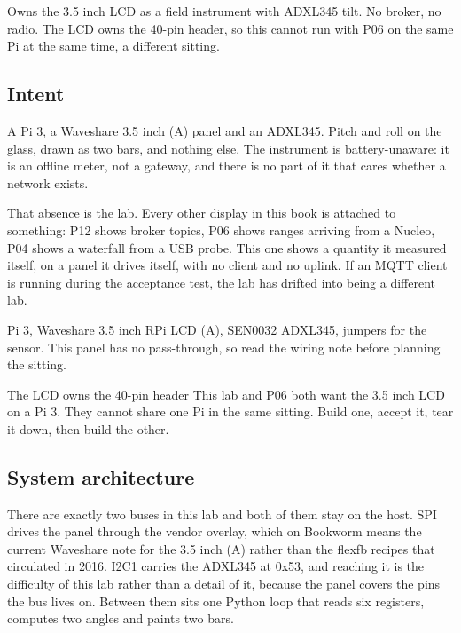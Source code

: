 
\begin{unique}
Owns the 3.5 inch LCD as a field instrument with ADXL345 tilt. No broker, no radio. The LCD owns the 40-pin header, so this cannot run with P06 on the same Pi at the same time, a different sitting.
\end{unique}

\subsection*{Intent}

A Pi 3, a Waveshare 3.5 inch (A) panel and an ADXL345. Pitch and roll on the glass, drawn as two bars, and nothing else. The instrument is battery-unaware: it is an offline meter, not a gateway, and there is no part of it that cares whether a network exists.

That absence is the lab. Every other display in this book is attached to something: P12 shows broker topics, P06 shows ranges arriving from a Nucleo, P04 shows a waterfall from a USB probe. This one shows a quantity it measured itself, on a panel it drives itself, with no client and no uplink. If an MQTT client is running during the acceptance test, the lab has drifted into being a different lab.

\begin{kit}
Pi 3, Waveshare 3.5 inch RPi LCD (A), SEN0032 ADXL345, jumpers for the sensor. This panel has no pass-through, so read the wiring note before planning the sitting.
\end{kit}

\begin{rulebox}{The LCD owns the 40-pin header}
This lab and P06 both want the 3.5 inch LCD on a Pi 3. They cannot share one Pi in the same sitting. Build one, accept it, tear it down, then build the other.
\end{rulebox}

\subsection*{System architecture}


There are exactly two buses in this lab and both of them stay on the host. SPI drives the panel through the vendor overlay, which on Bookworm means the current Waveshare note for the 3.5 inch (A) rather than the flexfb recipes that circulated in 2016. I2C1 carries the ADXL345 at 0x53, and reaching it is the difficulty of this lab rather than a detail of it, because the panel covers the pins the bus lives on. Between them sits one Python loop that reads six registers, computes two angles and paints two bars.

